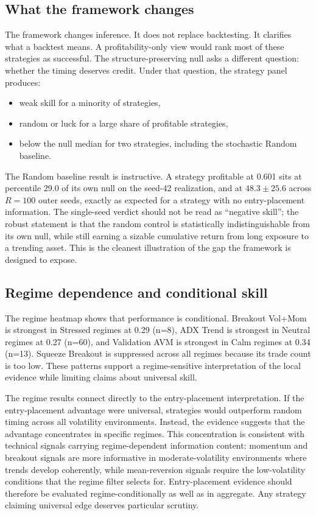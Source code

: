 \documentclass[preprint,12pt]{elsarticle}
\theoremstyle{definition}
\begin{document}
\subsection{What the framework changes}

The framework changes inference. It does not replace backtesting. It clarifies what a backtest means. A profitability-only view would rank most of these strategies as successful. The structure-preserving null asks a different question: whether the timing deserves credit. Under that question, the strategy panel produces:
\begin{itemize}
\item weak skill for a minority of strategies,
\item random or luck for a large share of profitable strategies,
\item below the null median for two strategies, including the stochastic Random baseline.
\end{itemize}

The Random baseline result is instructive. A strategy profitable at 0.601 sits at percentile 29.0 of its own null on the seed-42 realization, and at $48.3\pm 25.6$ across $R=100$ outer seeds, exactly as expected for a strategy with no entry-placement information. The single-seed verdict should not be read as ``negative skill''; the robust statement is that the random control is statistically indistinguishable from its own null, while still earning a sizable cumulative return from long exposure to a trending asset. This is the cleanest illustration of the gap the framework is designed to expose.

\subsection{Regime dependence and conditional skill}

The regime heatmap shows that performance is conditional. Breakout Vol+Mom is strongest in Stressed regimes at 0.29 (n=8), ADX Trend is strongest in Neutral regimes at 0.27 (n=60), and Validation AVM is strongest in Calm regimes at 0.34 (n=13). Squeeze Breakout is suppressed across all regimes because its trade count is too low. These patterns support a regime-sensitive interpretation of the local evidence while limiting claims about universal skill.

The regime results connect directly to the entry-placement interpretation. If the entry-placement advantage were universal, strategies would outperform random timing across all volatility environments. Instead, the evidence suggests that the advantage concentrates in specific regimes. This concentration is consistent with technical signals carrying regime-dependent information content: momentum and breakout signals are more informative in moderate-volatility environments where trends develop coherently, while mean-reversion signals require the low-volatility conditions that the regime filter selects for. Entry-placement evidence should therefore be evaluated regime-conditionally as well as in aggregate. Any strategy claiming universal edge deserves particular scrutiny.
\end{document}

